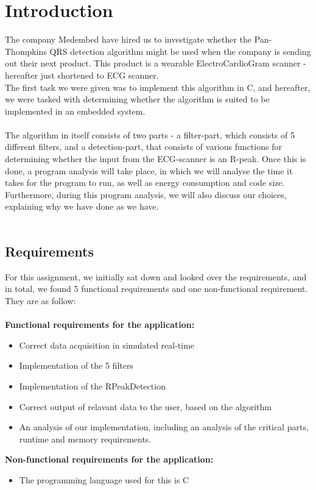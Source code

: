 \documentclass[12pt,a4paper]{article}
\begin{document}
\section{Introduction}
	The company Medembed have hired us to investigate whether the Pan-Thompkins QRS detection algorithm might be used when the company is sending out their next product. This product is a wearable ElectroCardioGram scanner - hereafter just shortened to ECG scanner.\\
	The first task we were given was to implement this algorithm in C, and hereafter, we were tasked with determining whether the algorithm is suited to be implemented in an embedded system.\\
\\
	The algorithm in itself consists of two parts - a filter-part, which consists of 5 different filters, and a detection-part, that consists of various functions for determining whether the input from the ECG-scanner is an R-peak. Once this is done, a program analysis will take place, in which we will analyse the time it takes for the program to run, as well as energy consumption and code size. Furthermore, during this program analysis, we will also discuss our choices, explaining why we have done as we have.\\
\\
\subsection{Requirements}
For this assignment, we initially sat down and looked over the requirements, and in total, we found 5 functional requirements and one non-functional requirement. They are as follow: \\
\\
\textbf{ Functional requirements for the application:}
\begin{itemize}
	\item Correct data acquisition in simulated real-time
	\item Implementation of the 5 filters
	\item Implementation of the RPeakDetection
	\item Correct output of relavant data to the user, based on the algorithm
	\item An analysis of our implementation, including an analysis of the critical parts, runtime and memory requirements.
\end{itemize}
\textbf{Non-functional requirements for the application:}
\begin {itemize}
	\item The programming language used for this is C
\end{itemize}
\end{document}
